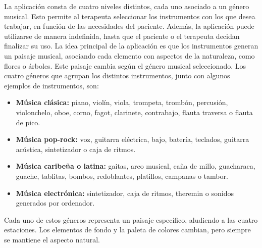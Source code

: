 La aplicación consta de cuatro niveles distintos, cada uno asociado a un género musical. Esto permite al terapeuta seleccionar los instrumentos con los que desea trabajar, en función de las necesidades del paciente. Además, la aplicación puede utilizarse de manera indefinida, hasta que el paciente o el terapeuta decidan finalizar su uso. La idea principal de la aplicación es que los instrumentos generan un paisaje musical, asociando cada elemento con aspectos de la naturaleza, como flores o árboles. Este paisaje cambia según el género musical seleccionado. Los cuatro géneros que agrupan los distintos instrumentos, junto con algunos ejemplos de instrumentos, son:

\begin{itemize}
	\item \textbf{Música clásica:} piano, violín, viola, trompeta, trombón, percusión, violonchelo, oboe, corno, fagot, clarinete, contrabajo, flauta traversa o flauta de pico.
	\item \textbf{Música pop-rock:} voz, guitarra eléctrica, bajo, batería, teclados, guitarra acústica, sintetizador o caja de ritmos.
	\item \textbf{Música caribeña o latina:} gaitas, arco musical, caña de millo, guacharaca, guache, tablitas, bombos, redoblantes, platillos, campanas o tambor.
	\item \textbf{Música electrónica:} sintetizador, caja de ritmos, theremin o sonidos generados por ordenador.
\end{itemize}

Cada uno de estos géneros representa un paisaje específico, aludiendo a las cuatro estaciones. Los elementos de fondo y la paleta de colores cambian, pero siempre se mantiene el aspecto natural.

